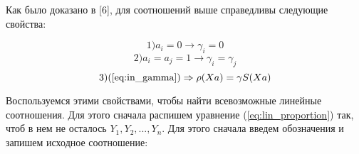 \documentclass[a4paper,12pt]{report}
\theoremstyle{plain} %
\theoremstyle{definition}
\theoremstyle{remark}
\begin{document}
\begin{large}
Как было доказано в [6], для соотношений выше справедливы следующие свойства:

 \begin{equation} \label{eq:lin_property1} 1) a_i = 0 \rightarrow \gamma_i = 0 \end{equation}
 \begin{equation} \label{eq:lin_property2} 2) a_i = a_j = 1 \rightarrow \gamma_i = \gamma_j  
 \end{equation}
\begin{equation} \label{eq:lin_property3} 3)(\ref{eq:in_gamma}) \Rightarrow \rho (Xa) = \gamma S(Xa) \end{equation}

Воспользуемся этими свойствами, чтобы найти всевозможные линейные соотношения. Для этого сначала распишем уравнение (\ref{eq:lin_proportion}) так, чтоб в нем не осталось $Y_1, Y_2, ..., Y_n$. Для этого сначала введем обозначения и запишем исходное соотношение:


\end{large}
\end{document}
